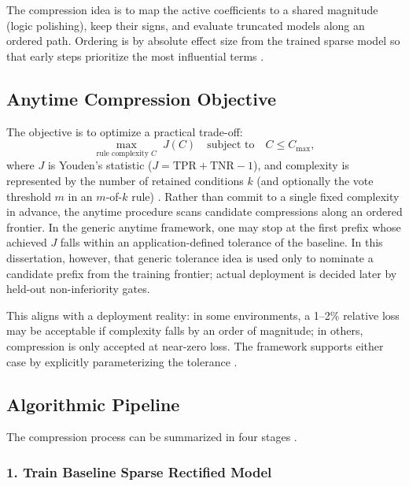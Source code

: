 The compression idea is to map the active coefficients to a shared magnitude (logic polishing), keep their signs, and evaluate truncated models along an ordered path. Ordering is by absolute effect size from the trained sparse model so that early steps prioritize the most influential terms \autocite{JOrender2025Anytime}.

\subsection{Anytime Compression Objective}

The objective is to optimize a practical trade-off:
\begin{equation}
\label{eq:rq3-anytime-compression-objective}
\max_{\text{rule complexity } C} \; J(C) \quad \text{subject to} \quad C \leq C_{\max},
\end{equation}
where $J$ is Youden's statistic ($J=\mathrm{TPR}+\mathrm{TNR}-1$), and complexity is represented by the number of retained conditions $k$ (and optionally the vote threshold $m$ in an $m$-of-$k$ rule) \autocite{JOrender2025Anytime}. Rather than commit to a single fixed complexity in advance, the anytime procedure scans candidate compressions along an ordered frontier. In the generic anytime framework, one may stop at the first prefix whose achieved $J$ falls within an application-defined tolerance of the baseline. In this dissertation, however, that generic tolerance idea is used only to nominate a candidate prefix from the training frontier; actual deployment is decided later by held-out non-inferiority gates.

This aligns with a deployment reality: in some environments, a 1--2\% relative loss may be acceptable if complexity falls by an order of magnitude; in others, compression is only accepted at near-zero loss. The framework supports either case by explicitly parameterizing the tolerance \autocite{JOrender2025Anytime}.

\subsection{Algorithmic Pipeline}

The compression process can be summarized in four stages \autocite{JOrender2025Anytime}.

\subsubsection{1. Train Baseline Sparse Rectified Model}

